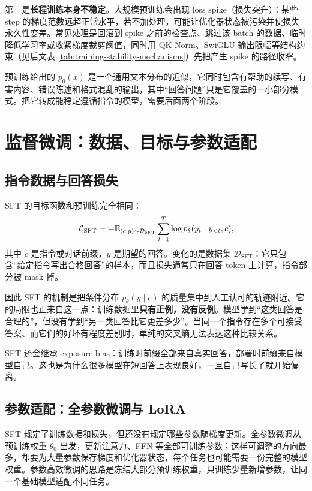 第三是\textbf{长程训练本身不稳定}。大规模预训练会出现 loss spike（损失突升）：某些 step 的梯度范数远超正常水平，若不加处理，可能让优化器状态被污染并使损失永久性变差。常见处理是回滚到 spike 之前的检查点、跳过该 batch 的数据、临时降低学习率或收紧梯度裁剪阈值，同时用 QK-Norm、SwiGLU 输出限幅等结构约束（见后文表 \ref{tab:training-stability-mechanisms}）先把产生 spike 的路径收窄。

预训练给出的 \(p_0(x)\) 是一个通用文本分布的近似，它同时包含有帮助的续写、有害内容、错误陈述和格式混乱的输出，其中“回答问题”只是它覆盖的一小部分模式。把它转成能稳定遵循指令的模型，需要后面两个阶段。

\section{监督微调：数据、目标与参数适配}
\label{sec:sft}

\subsection{指令数据与回答损失}

SFT 的目标函数和预训练完全相同：
\begin{equation}
 \mathcal L_{\mathrm{SFT}}
 =-\mathbb{E}_{(c,y)\sim\mathcal D_{\mathrm{SFT}}}
 \sum_{t=1}^{T}\log p_\theta(y_t\mid y_{<t},c),
\end{equation}
其中 \(c\) 是指令或对话前缀，\(y\) 是期望的回答。变化的是数据集 \(\mathcal D_{\mathrm{SFT}}\)：它只包含“给定指令写出合格回答”的样本，而且损失通常只在回答 token 上计算，指令部分被 mask 掉。

因此 SFT 的机制是把条件分布 \(p_\theta(y\mid c)\) 的质量集中到人工认可的轨迹附近。它的局限也正来自这一点：训练数据里\textbf{只有正例，没有反例}。模型学到“这类回答是合理的”，但没有学到“另一类回答比它更差多少”。当同一个指令存在多个可接受答案、而它们的好坏有程度差别时，单纯的交叉熵无法表达这种比较关系。

SFT 还会继承 exposure bias：训练时前缀全部来自真实回答，部署时前缀来自模型自己。这也是为什么很多模型在短回答上表现良好，一旦自己写长了就开始偏离。

\subsection{参数适配：全参数微调与 LoRA}

SFT 规定了训练数据和损失，但还没有规定哪些参数随梯度更新。全参数微调从预训练权重 \(\theta_0\) 出发，更新注意力、FFN 等全部可训练参数；这样可调整的方向最多，却要为大量参数保存梯度和优化器状态，每个任务也可能需要一份完整的模型权重。参数高效微调的思路是冻结大部分预训练权重，只训练少量新增参数，让同一个基础模型适配不同任务。

